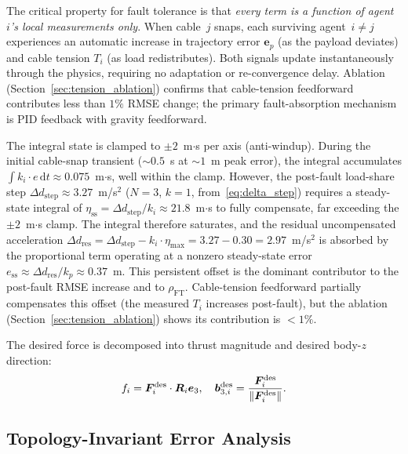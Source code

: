 The critical property for fault tolerance is that \emph{every term is a function of agent~$i$'s local measurements only}. When cable~$j$ snaps, each surviving agent~$i \neq j$ experiences an automatic increase in trajectory error $\bm{e}_p$ (as the payload deviates) and cable tension $T_i$ (as load redistributes). Both signals update instantaneously through the physics, requiring no adaptation or re-convergence delay. Ablation (Section~\ref{sec:tension_ablation}) confirms that cable-tension feedforward contributes less than $1\%$ RMSE change; the primary fault-absorption mechanism is PID feedback with gravity feedforward.

The integral state is clamped to $\pm 2$~m$\cdot$s per axis (anti-windup). During the initial cable-snap transient (${\sim}0.5$~s at ${\sim}1$~m peak error), the integral accumulates $\int k_i \cdot e\,\mathrm{d}t \approx 0.075$~m$\cdot$s, well within the clamp. However, the post-fault load-share step $\Delta d_{\mathrm{step}} \approx 3.27$~m/s$^2$ ($N{=}3$, $k{=}1$, from~\eqref{eq:delta_step}) requires a steady-state integral of $\eta_{\mathrm{ss}} = \Delta d_{\mathrm{step}} / k_i \approx 21.8$~m$\cdot$s to fully compensate, far exceeding the $\pm 2$~m$\cdot$s clamp. The integral therefore saturates, and the residual uncompensated acceleration $\Delta d_{\mathrm{res}} = \Delta d_{\mathrm{step}} - k_i \cdot \eta_{\max} = 3.27 - 0.30 = 2.97$~m/s$^2$ is absorbed by the proportional term operating at a nonzero steady-state error $e_{\mathrm{ss}} \approx \Delta d_{\mathrm{res}} / k_p \approx 0.37$~m. This persistent offset is the dominant contributor to the post-fault RMSE increase and to $\rho_{\mathrm{FT}}$. Cable-tension feedforward partially compensates this offset (the measured $T_i$ increases post-fault), but the ablation (Section~\ref{sec:tension_ablation}) shows its contribution is ${<}1\%$.

The desired force is decomposed into thrust magnitude and desired body-$z$ direction:
\begin{equation}\label{eq:thrust_decomp}
  f_i = \bm{F}_i^{\mathrm{des}} \cdot \bm{R}_i \bm{e}_3, \quad \bm{b}_{3,i}^{\mathrm{des}} = \frac{\bm{F}_i^{\mathrm{des}}}{\lVert \bm{F}_i^{\mathrm{des}} \rVert}.
\end{equation}

\subsection{Topology-Invariant Error Analysis}
\label{sec:topology_invariance_theorem}

